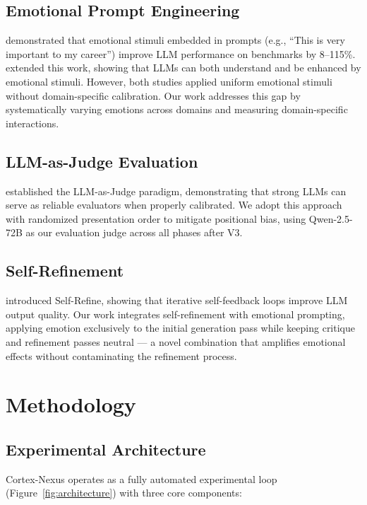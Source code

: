 \documentclass[lineno]{wlpeerj}
\begin{document}
\subsection{Emotional Prompt Engineering}

\citet{coda2023emotionprompt} demonstrated that emotional stimuli embedded in prompts (e.g., ``This is very important to my career'') improve LLM performance on benchmarks by 8--115\%. \citet{li2024more} extended this work, showing that LLMs can both understand and be enhanced by emotional stimuli. However, both studies applied uniform emotional stimuli without domain-specific calibration. Our work addresses this gap by systematically varying emotions across domains and measuring domain-specific interactions.

\subsection{LLM-as-Judge Evaluation}

\citet{zheng2023judging} established the LLM-as-Judge paradigm, demonstrating that strong LLMs can serve as reliable evaluators when properly calibrated. We adopt this approach with randomized presentation order to mitigate positional bias, using Qwen-2.5-72B as our evaluation judge across all phases after V3.

\subsection{Self-Refinement}

\citet{madaan2023self} introduced Self-Refine, showing that iterative self-feedback loops improve LLM output quality. Our work integrates self-refinement with emotional prompting, applying emotion exclusively to the initial generation pass while keeping critique and refinement passes neutral --- a novel combination that amplifies emotional effects without contaminating the refinement process.

\section{Methodology}

\subsection{Experimental Architecture}

Cortex-Nexus operates as a fully automated experimental loop (Figure~\ref{fig:architecture}) with three core components:
\end{document}
